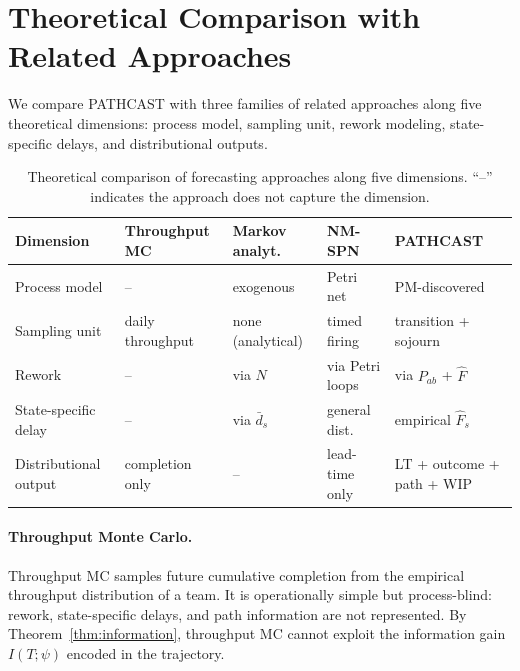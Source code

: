 %

\section{Theoretical Comparison with Related Approaches}
\label{sec:comparison}

We compare PATHCAST with three families of related approaches along
five theoretical dimensions: process model, sampling unit, rework
modeling, state-specific delays, and distributional outputs.

\begin{table}[ht]
\centering
\caption{Theoretical comparison of forecasting approaches along five
dimensions. ``--'' indicates the approach does not capture the
dimension.}
\label{tab:approach-comparison}
\small
\begin{tabular}{@{}l l l l l@{}}
\toprule
\textbf{Dimension}    &
\textbf{Throughput MC}~\cite{vacanti2015} &
\textbf{Markov analyt.}~\cite{kemeny1976finite} &
\textbf{NM-SPN}~\cite{RoggeSolti2015NonMarkovianSPN} &
\textbf{PATHCAST} \\
\midrule
Process model         & --                 & exogenous          & Petri net          & PM-discovered \\
Sampling unit         & daily throughput   & none (analytical)  & timed firing       & transition + sojourn \\
Rework                & --                 & via $N$           & via Petri loops    & via $P_{ab}$ + $\hat{F}$ \\
State-specific delay  & --                 & via $\bar{d}_s$    & general dist.      & empirical $\hat{F}_s$ \\
Distributional output & completion only    & --                 & lead-time only     & LT + outcome + path + WIP \\
\bottomrule
\end{tabular}
\end{table}

\paragraph{Throughput Monte Carlo.}
Throughput MC samples future cumulative completion from the empirical
throughput distribution of a team. It is operationally simple but
process-blind: rework, state-specific delays, and path information are
not represented. By Theorem~\ref{thm:information}, throughput MC
cannot exploit the information gain $I(T;\psi)$ encoded in the
trajectory.

